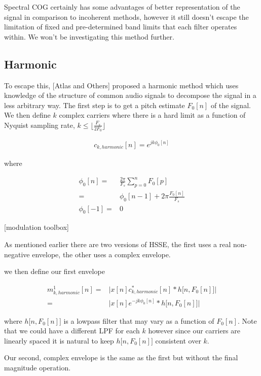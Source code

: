 \documentclass [11pt, proquest,oneside] {uwthesis}[2015/03/03]
\begin{document}
Spectral COG certainly has some advantages of better representation of the signal in comparison to incoherent methods, however it still doesn't escape the limitation of fixed and pre-determined band limits that each filter operates within.  We won't be investigating this method further.

\subsection{Harmonic}

To escape this, [Atlas and Others] proposed a harmonic method which uses knowledge of the structure of common audio signals to decompose the signal in a less arbitrary way.  The first step is to get a pitch estimate $F_0[n]$ of the signal.  We then define $k$ complex carriers where there is a hard limit as a function of Nyquist sampling rate, $k \leq  \lfloor \frac{F_s}{2F_0} \rfloor$

\begin{align}
c_{k,harmonic}[n] = e^{jk\phi_0 [n]}
\end{align}

where 

\begin{align}
\phi_0[n] =& \frac{2\pi}{F_s} \sum_{p=0}^{n} F_0[p] \nonumber \\
=& \phi_0[n - 1] + 2\pi \frac{F_0[n]}{F_s} \\
\phi_0[-1] =& 0 \nonumber
\end{align}

[modulation toolbox]

As mentioned earlier there are two versions of HSSE, the first uses a real non-negative envelope, the other uses a complex envelope.

we then define our first envelope

\begin{align}
m^1_{k,harmonic}[n] =& \Big| x[n] c_{k,harmonic}^*[n] * h\big[n, F_0[n] \big] \Big| \nonumber \\
=& \Big| x[n] e^{-jk\phi_0 [n]} * h\big[n, F_0[n] \big] \Big|
\end{align}

where $h\big[n, F_0[n] \big]$ is a lowpass filter that may vary as a function of $F_0[n]$.  Note that we could have a different LPF for each $k$ however since our carriers are linearly spaced it is natural to keep $h\big[n, F_0[n] \big]$ consistent over $k$.

Our second, complex envelope is the same as the first but without the final magnitude operation.
\end{document}
